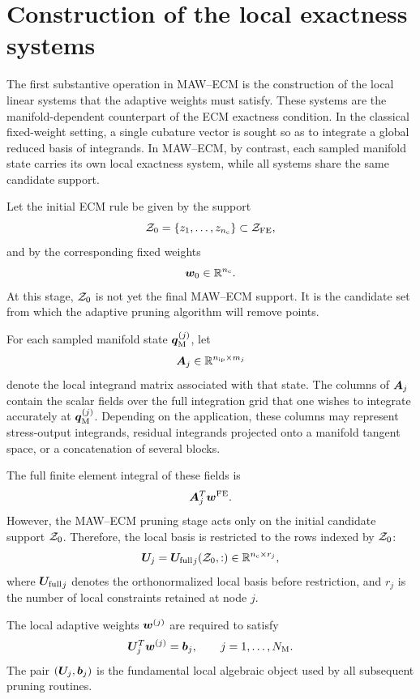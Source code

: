 \documentclass[11pt,a4paper]{article}
\begin{document}
\section{Construction of the local exactness systems}
\label{sec:local_exactness_systems}

The first substantive operation in MAW--ECM is the construction of the local
linear systems that the adaptive weights must satisfy. These systems are the
manifold-dependent counterpart of the ECM exactness condition. In the classical
fixed-weight setting, a single cubature vector is sought so as to integrate a
global reduced basis of integrands. In MAW--ECM, by contrast, each sampled
manifold state carries its own local exactness system, while all systems share
the same candidate support.

Let the initial ECM rule be given by the support
\[
        \mathcal{Z}_{0} = \{z_1,\ldots,z_{n_{\mathrm{c}}}\}
        \subset \mathcal{Z}_{\mathrm{FE}},
\]
and by the corresponding fixed weights
\[
        \bm w_{0} \in \mathbb{R}^{n_{\mathrm{c}}}.
\]
At this stage, $\mathcal{Z}_{0}$ is not yet the final MAW--ECM support. It is the
candidate set from which the adaptive pruning algorithm will remove points.

For each sampled manifold state $\bm q_{\mathrm{M}}^{(j)}$, let
\[
        \bm A_j \in \mathbb{R}^{n_{\mathrm{ip}}\times m_j}
\]
denote the local integrand matrix associated with that state. The columns of
$\bm A_j$ contain the scalar fields over the full integration grid that one
wishes to integrate accurately at $\bm q_{\mathrm{M}}^{(j)}$. Depending on the application, these
columns may represent stress-output integrands, residual integrands projected
onto a manifold tangent space, or a concatenation of several blocks.

The full finite element integral of these fields is
\[
        \bm A_j^T \bm w^{\mathrm{FE}}.
\]
However, the MAW--ECM pruning stage acts only on the initial candidate support
$\mathcal{Z}_{0}$. Therefore, the local basis is restricted to the rows indexed by
$\mathcal{Z}_{0}$:
\[
        \bm U_j
        =
        {\bm U_{\mathrm{full}}}_j(\mathcal{Z}_{0},:)
        \in \mathbb{R}^{n_{\mathrm{c}}\times r_j},
\]
where ${\bm U_{\mathrm{full}}}_j$ denotes the orthonormalized local basis before restriction,
and $r_j$ is the number of local constraints retained at node $j$.

The local adaptive weights $\bm w^{(j)}$ are required to satisfy
\[
        \bm U_j^T \bm w^{(j)} = \bm b_j,
        \qquad
        j=1,\ldots,N_{\mathrm{M}}.
        \label{eq:maw_local_system}
\]
The pair $(\bm U_j,\bm b_j)$ is the fundamental local algebraic object used by all
subsequent pruning routines.
\end{document}
